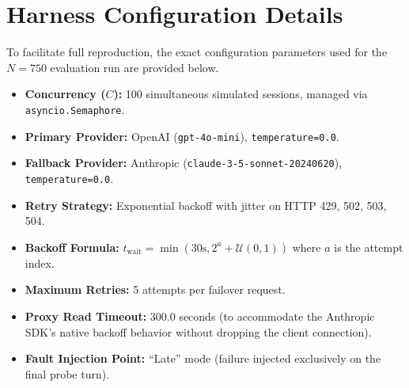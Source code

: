 \section{Harness Configuration Details}
\label{app:config}

To facilitate full reproduction, the exact configuration parameters used for the $N=750$ evaluation run are provided below.

\begin{itemize}
    \item \textbf{Concurrency ($C$):} 100 simultaneous simulated sessions, managed via \texttt{asyncio.Semaphore}.
    \item \textbf{Primary Provider:} OpenAI (\texttt{gpt-4o-mini}), \texttt{temperature=0.0}.
    \item \textbf{Fallback Provider:} Anthropic (\texttt{claude-3-5-sonnet-20240620}), \texttt{temperature=0.0}.
    \item \textbf{Retry Strategy:} Exponential backoff with jitter on HTTP 429, 502, 503, 504.
    \item \textbf{Backoff Formula:} $t_{\text{wait}} = \min(30\text{s}, 2^a + \mathcal{U}(0, 1))$ where $a$ is the attempt index.
    \item \textbf{Maximum Retries:} 5 attempts per failover request.
    \item \textbf{Proxy Read Timeout:} 300.0 seconds (to accommodate the Anthropic SDK's native backoff behavior without dropping the client connection).
    \item \textbf{Fault Injection Point:} ``Late'' mode (failure injected exclusively on the final probe turn).
\end{itemize}
